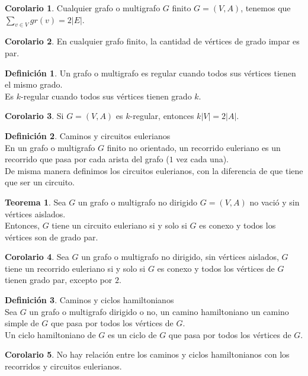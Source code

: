 \documentclass[10pt]{article}
\theoremstyle{definition}
\newtheorem{definition}{Definición}[section]
\newtheorem{theorem}{Teorema}[section]
\newtheorem{corollary}{Corolario}[theorem]
\begin{document}
\begin{corollary}
	Cualquier grafo o multigrafo $G$ finito $G=(V,A)$, tenemos que $\sum_{v\in V} gr(v)=2|E|$.
\end{corollary}
\begin{corollary}
	En cualquier grafo finito, la cantidad de vértices de grado impar es par.
\end{corollary}
\begin{definition}
	Un grafo o multigrafo es regular cuando todos sus vértices tienen el mismo grado.\\
	Es $k$-regular cuando todos sus vértices tienen grado $k$.
\end{definition}
\begin{corollary}
	Si $G=(V,A)$ es $k$-regular, entonces $k|V|=2|A|$.
\end{corollary}
\begin{definition}{Caminos y circuitos eulerianos}
	\\En un grafo o multigrafo $G$ finito no orientado, un recorrido euleriano es un recorrido que pasa por cada arista del grafo ($1$ vez cada una).
	\\De misma manera definimos los circuitos eulerianos, con la diferencia de que tiene que ser un circuito.
\end{definition}
\begin{theorem}
	Sea $G$ un grafo o multigrafo no dirigido $G=(V,A)$ no vació y sin vértices aislados.\\
	Entonces, $G$ tiene un circuito euleriano si y solo si $G$ es conexo y todos los vértices son de grado par.
\end{theorem}
\begin{corollary}
	Sea $G$ un grafo o multigrafo no dirigido, sin vértices aislados, $G$ tiene un recorrido euleriano si y solo si $G$ es conexo y todos los vértices de $G$ tienen grado par, excepto por $2$.
\end{corollary}
\begin{definition}{Caminos y ciclos hamiltonianos}
	\\Sea $G$ un grafo o multigrafo dirigido o no, un camino hamiltoniano un camino simple de $G$ que pasa por todos los vértices de $G$.\\
	Un ciclo hamiltoniano de $G$ es un ciclo de $G$ que pasa por todos los vértices de $G$.
\end{definition}
\begin{corollary}
	No hay relación entre los caminos y ciclos hamiltonianos con los recorridos y circuitos eulerianos.
\end{corollary}
\end{document}
